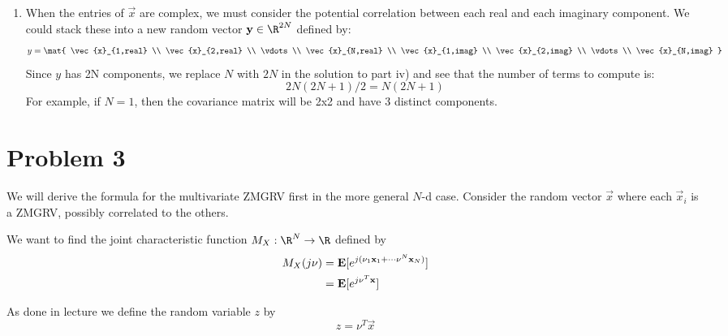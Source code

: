 \documentclass{homework}
\begin{document}
\begin{enumerate}[label=\roman*)]
    \item When the entries of $\vec{x}$ are complex, we must consider the potential
        correlation between each real and each imaginary component. We could stack
        these into a new random vector $\vec{y} \in \R^{2N}$ defined by:
        \begin{equation*}
            y = \mat{
                \vec{x}_{1,real} \\
                \vec{x}_{2,real} \\
                \vdots \\
                \vec{x}_{N,real} \\
                \vec{x}_{1,imag} \\
                \vec{x}_{2,imag} \\
                \vdots \\
                \vec{x}_{N,imag}
            }
        \end{equation*}
        Since $y$ has 2N components, we replace $N$ with $2N$ in the solution to
        part iv) and see that the number of terms to compute is:
        \begin{equation*}
            2N(2N + 1) / 2 = N(2N + 1)
        \end{equation*}
        For example, if $N=1$, then the covariance matrix will be 2x2 and have 3 distinct
        components.
\end{enumerate}

\section{Problem 3}

We will derive the formula for the multivariate ZMGRV first in the more
general $N$-d case. Consider the random vector $\vec{x}$ where each $\vec{x}_i$
is a ZMGRV, possibly correlated to the others.

We want to find the joint characteristic function $M_X: \R^N \to \R$ defined by
\begin{align}
    M_X(j {\bf \nu}) &= {\bf E}[e^{j({\bf \nu}_1 {\bf x}_1 + \cdots {\bf \nu}^N {\bf x}_N)}] \\
        &= {\bf E}[e^{j {\bf \nu}^T {\bf x}}]
        \label{eq:joint-char-func}
\end{align}

As done in lecture we define the random variable $z$ by
\begin{equation*}
    z = \nu^T \vec{x}
\end{equation*}
\end{document}
